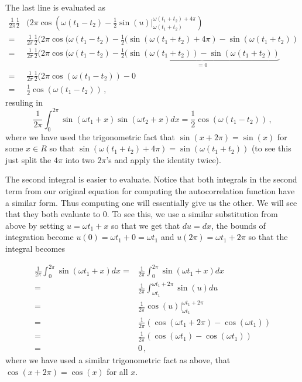 The last line is evaluated as
\begin{align*}
  \frac{1}{2\pi} \frac{1}{2} & ( 2\pi \cos(\omega(t_1 - t_2) - \frac{1}{2} \left. \sin(u)  \right|_{\omega(t_1 + t_2)}^{\omega(t_1 + t_2) + 4\pi} ) \\
  = & \frac{1}{2\pi} \frac{1}{2} ( 2\pi \cos(\omega(t_1 - t_2) - \frac{1}{2} (\sin( \omega(t_1 + t_2) + 4\pi) - \sin( \omega(t_1 + t_2)) \\
  = & \frac{1}{2\pi} \frac{1}{2} ( 2\pi \cos(\omega(t_1 - t_2) - \frac{1}{2} \underbrace{ (\sin( \omega(t_1 + t_2)) - \sin( \omega(t_1 + t_2))}_{=0} \\
  = & \frac{1}{2\pi} \frac{1}{2} ( 2\pi \cos(\omega(t_1 - t_2 ) ) - 0 \\ 
  = & \frac{1}{2} \cos(\omega(t_1 - t_2 ) )
  \, ,
\end{align*}
resuling in
\begin{equation*}
  \frac{1}{2\pi}\int_{0}^{2\pi}\sin(\omega t_1 + x) \sin(\omega t_2 + x)dx = \frac{1}{2} \cos(\omega(t_1 - t_2 ) )
  \, ,
\end{equation*}
where we have used the trigonometric fact that $\sin(x + 2\pi) = \sin(x)$ for some $x \in R$ so that $\sin(\omega(t_1 + t_2) + 4\pi) = \sin(\omega(t_1 + t_2))$ (to see this just split the $4\pi$ into two $2\pi$'s and apply the identity twice).

The second integral is easier to evaluate.
Notice that both integrals in the second term from our original equation for computing the autocorrelation function have a similar form.
Thus computing one will essentially give us the other.
We will see that they both evaluate to $0$.
To see this, we use a similar substitution from above by setting $u = \omega t_1 + x $ so that we get that $ du = dx$, the bounds of integration become $u(0) = \omega t_1 + 0 = \omega t_1$ and $u(2\pi) = \omega t_1 + 2\pi$ so that the integral becomes

 \begin{align*}
  \frac{1}{2\pi}\int_{0}^{2\pi}\sin(\omega t_1 + x)dx = & \frac{1}{2\pi}\int_{0}^{2\pi}\sin(\omega t_1 + x)dx \\
  = & \frac{1}{2\pi}\int_{\omega t_1}^{\omega t_1 + 2\pi}\sin(u)du \\
  = &  \frac{1}{2\pi} \left. \cos(u) \right|_{\omega t_1}^{\omega t_1 + 2\pi} \\
  = & \frac{1}{2\pi}  (\cos(\omega t_1 + 2\pi) - \cos(\omega t_1) ) \\
  = & \frac{1}{2\pi}  (\cos(\omega t_1) - \cos(\omega t_1) ) \\
  = & 0
  \, ,
 \end{align*}
where we have used a similar trigonometric fact as above, that $\cos(x + 2\pi) = \cos(x)$ for all $x$.

